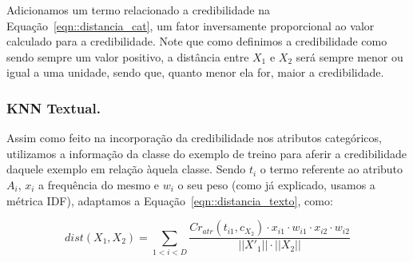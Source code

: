 Adicionamos um termo relacionado a credibilidade na Equação~\ref{eqn::distancia_cat}, um fator inversamente proporcional ao valor calculado para a credibilidade. Note que como definimos a credibilidade como sendo sempre um valor positivo, a distância entre $X_1$ e $X_2$ será sempre menor ou igual a uma unidade, sendo que, quanto menor ela for, maior a credibilidade. 


\subsubsection{\textsc{KNN} Textual.}
\label{subsubsec::knntexto}

Assim como feito na incorporação da credibilidade nos atributos categóricos, utilizamos a informação da classe do exemplo de treino para aferir a credibilidade daquele exemplo em relação àquela classe. Sendo $t_i$ o termo referente ao atributo $A_i$, $x_i$ a frequência do mesmo e $w_i$ o seu peso (como já explicado, usamos a métrica \textsc{IDF}), adaptamos a Equação~\ref{eqn::distancia_texto}, como:

\begin{equation}\label{eqn::distancia_texto_cat}
    dist(X_1, X_2) = \sum\limits_{1 < i < D}\frac{  Cr_{atr}(t_{i1}, c_{X_2}) \cdot x_{i1} \cdot w_{i1} \cdot x_{i2} \cdot w_{i2} }{ ||X'_1|| \cdot ||X_2|| }
\end{equation}

